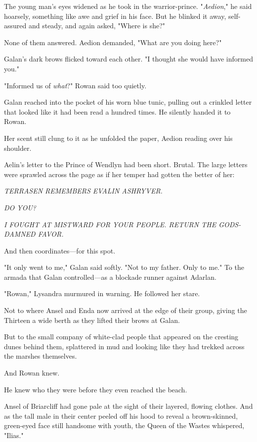 The young man's eyes widened as he took in the warrior-prince.
"\emph{Aedion}," he said hoarsely, something like awe and grief in his face.
But he blinked it away, self-assured and steady, and again asked, "Where is she?"

None of them answered.
Aedion demanded, "What are you doing here?"

Galan's dark brows flicked toward each other.
"I thought she would have informed you."

"Informed us of \emph{what}?"
Rowan said too quietly.

Galan reached into the pocket of his worn blue tunic, pulling out a crinkled letter that looked like it had been read a hundred times.
He silently handed it to Rowan.

Her scent still clung to it as he unfolded the paper, Aedion reading over his shoulder.

Aelin's letter to the Prince of Wendlyn had been short.
Brutal.
The large letters were sprawled across the page as if her temper had gotten the better of her:

\emph{TERRASEN REMEMBERS EVALIN ASHRYVER.}

\emph{DO YOU?}

\emph{I FOUGHT AT MISTWARD FOR YOUR PEOPLE.
RETURN THE GODS-DAMNED FAVOR.}

And then coordinates---for this spot.

"It only went to me," Galan said softly.
"Not to my father.
Only to me."
To the armada that Galan controlled---as a blockade runner against Adarlan.

"Rowan," Lysandra murmured in warning.
He followed her stare.

Not to where Ansel and Enda now arrived at the edge of their group, giving the Thirteen a wide berth as they lifted their brows at Galan.

But to the small company of white-clad people that appeared on the cresting dunes behind them, splattered in mud and looking like they had trekked across the marshes themselves.

And Rowan knew.

He knew who they were before they even reached the beach.

Ansel of Briarcliff had gone pale at the sight of their layered, flowing clothes.
And as the tall male in their center peeled off his hood to reveal a brown-skinned, green-eyed face still handsome with youth, the Queen of the Wastes whispered, "Ilias."

